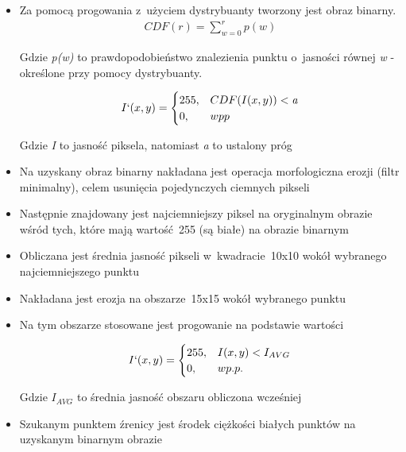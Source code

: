 \begin{itemize}
    \item Za pomocą progowania z~użyciem dystrybuanty tworzony jest obraz binarny.\\
    \begin{align}
        CDF(r) = \sum_{w=0}^{r} p(w)
    \end{align}
    
    Gdzie \textit{p(w)} to prawdopodobieństwo znalezienia punktu o~jasności równej \textit{w} - określone przy pomocy dystrybuanty.
    
    \begin{align}
        I`(x, y) = 
        \begin{cases}
            255, &  CDF(I(x, y)) < \textit{a}\\
            0,   &  wpp
        \end{cases}
    \end{align} 
    
    Gdzie \textit{I} to jasność piksela, natomiast \textit{a} to ustalony próg

    \item Na uzyskany obraz binarny nakładana jest operacja morfologiczna erozji (filtr minimalny), celem usunięcia pojedynczych ciemnych pikseli
    
    \item Następnie znajdowany jest najciemniejszy piksel na oryginalnym obrazie wśród tych, które mają wartość~255 (są białe) na obrazie binarnym
    
    \item Obliczana jest średnia jasność pikseli w~kwadracie~10x10 wokół wybranego najciemniejszego punktu
    
    \item Nakładana jest erozja na obszarze~15x15 wokół wybranego punktu
    
    \item Na tym obszarze stosowane jest progowanie na podstawie wartości
    
    \begin{align}
        I`(x, y) = 
        \begin{cases}
            255, &  I(x, y) < I_{AVG}\\
            0,   &  wp.p.
        \end{cases}
    \end{align}
    
    Gdzie \textit{$I_{AVG}$} to średnia jasność obszaru obliczona wcześniej
    
    \item Szukanym punktem źrenicy jest środek ciężkości białych punktów na uzyskanym binarnym obrazie

\end{itemize}

